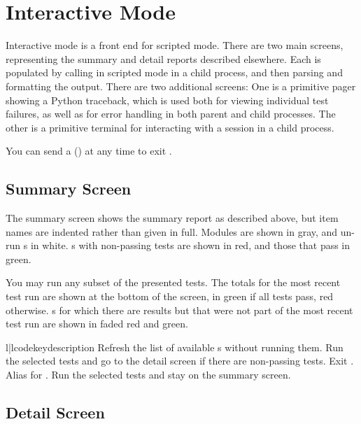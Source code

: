\chapter{Interactive Mode \label{interactive}}

Interactive mode is a front end for scripted mode. There are two main screens,
representing the summary and detail reports described elsewhere. Each is
populated by calling  in scripted mode in a child process,
and then parsing and formatting the output. There are two additional screens:
One is a primitive pager showing a Python traceback, which is used both for
viewing individual test failures, as well as for error handling in both parent
and child processes. The other is a primitive terminal for interacting with a
 session in a child process.

You can send a  () at any time to exit
.


\section{Summary Screen}

The summary screen shows the summary report as described above, but item names
are indented rather than given in full. Modules are shown in gray, and un-run
s in white. s with non-passing tests are shown in red, and those
that pass in green.

You may run any subset of the presented tests. The totals for the most recent
test run are shown at the bottom of the screen, in green if all tests pass, red
otherwise. s for which there are results but that were not part of the
most recent test run are shown in faded red and green.

\begin{tableii}{l|l}{code}{key}{description}
    {Refresh the list of available s without running them.}
    {Run the selected tests and go to the detail screen if there are non-passing
    tests.}
    {Exit .}
    {Alias for .}
    {Run the selected tests and stay on the summary screen.}
\end{tableii}


\section{Detail Screen}

